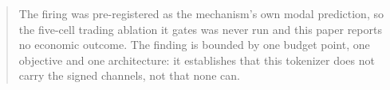 \documentclass[10pt]{article}
\begin{document}
\begin{abstract}
The firing was pre-registered as the mechanism's own modal prediction, so the five-cell trading
ablation it gates was never run and this paper reports no economic outcome. The finding is bounded
by one budget point, one objective and one architecture: it establishes that this tokenizer does
not carry the signed channels, not that none can.
\end{abstract}

%
\end{document}
